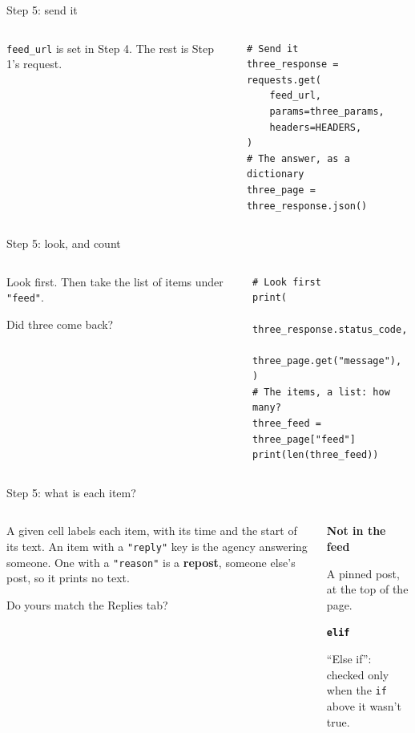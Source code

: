 \documentclass[9pt,aspectratio=169]{beamer}
\begin{document}
\begin{frame}[fragile]{Step 5: send it}
    \begin{columns}[T]
        \begin{column}{0.37\textwidth}
            \texttt{feed\_url} is set in Step 4. The rest is Step 1's request.
        \end{column}
        \begin{column}{0.6\textwidth}
\begin{lstlisting}
# Send it
three_response = requests.get(
    feed_url,
    params=three_params,
    headers=HEADERS,
)
# The answer, as a dictionary
three_page = three_response.json()
\end{lstlisting}
        \end{column}
    \end{columns}
\end{frame}

\begin{frame}[fragile]{Step 5: look, and count}
    \begin{columns}[T]
        \begin{column}{0.37\textwidth}
            Look first. Then take the list of items under \texttt{"feed"}.

            \medskip
            Did three come back?
        \end{column}
        \begin{column}{0.6\textwidth}
\begin{lstlisting}
# Look first
print(
    three_response.status_code,
    three_page.get("message"),
)
# The items, a list: how many?
three_feed = three_page["feed"]
print(len(three_feed))
\end{lstlisting}
        \end{column}
    \end{columns}
\end{frame}

\begin{frame}{Step 5: what is each item?}
    \begin{columns}[T]
        \begin{column}{0.6\textwidth}
            A given cell labels each item, with its time and the start of its text. An item with a \texttt{"reply"} key is the agency answering someone. One with a \texttt{"reason"} is a \textbf{repost}, someone else's post, so it prints no text.

            \medskip
            Do yours match the Replies tab?
        \end{column}
        \begin{column}{0.35\textwidth}
            \textbf{Not in the feed}\\[2pt]
            {\footnotesize A pinned post, at the top of the page.\par}
            \medskip
            \textbf{\texttt{elif}}\\[2pt]
            {\footnotesize ``Else if'': checked only when the \texttt{if} above it wasn't true.\par}
        \end{column}
    \end{columns}
\end{frame}
\end{document}
